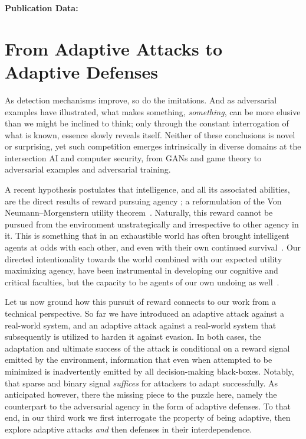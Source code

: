\textbf{Publication Data:} 

\section{From Adaptive Attacks to Adaptive Defenses}

As detection mechanisms improve, so do the imitations.
And as adversarial examples have illustrated, what makes something, \textit{something}, can be more elusive than we might be inclined to think; only through the constant interrogation of what is known, essence slowly reveals itself.
Neither of these conclusions is novel or surprising, yet such competition emerges intrinsically in diverse domains at the intersection \gls{AI} and computer security, from \gls{GAN}s and game theory to adversarial examples and adversarial training.

A recent hypothesis postulates that intelligence, and all its associated abilities, are the direct results of reward pursuing agency \cite{silver2021reward}; a reformulation of the Von Neumann–Morgenstern utility theorem~\cite{von1947theory}.
Naturally, this reward cannot be pursued from the environment unstrategically and irrespective to other agency in it.
This is something that in an exhaustible world has often brought intelligent agents at odds with each other, and even with their own continued survival~\cite{tohme2019superrational}.
Our directed intentionality towards the world combined with our expected utility maximizing agency, have been instrumental in developing our cognitive and critical faculties, but the capacity to be agents of our own undoing as well~\cite{rlblogpost, skalse2022defining}.

Let us now ground how this pursuit of reward connects to our work from a technical perspective.
So far we have introduced an adaptive attack against a real-world system, and an adaptive attack against a real-world system that subsequently is utilized to harden it against evasion.
In both cases, the adaptation and ultimate success of the attack is conditional on a reward signal emitted by the environment, information that even when attempted to be minimized is inadvertently emitted by all decision-making black-boxes.
Notably, that sparse and binary signal \textit{suffices} for attackers to adapt successfully.
As anticipated however, there the missing piece to the puzzle here, namely the counterpart to the adversarial agency in the form of adaptive defenses.
To that end, in our third work we first interrogate the property of being adaptive, then explore adaptive attacks \textit{and} then defenses in their interdependence.

